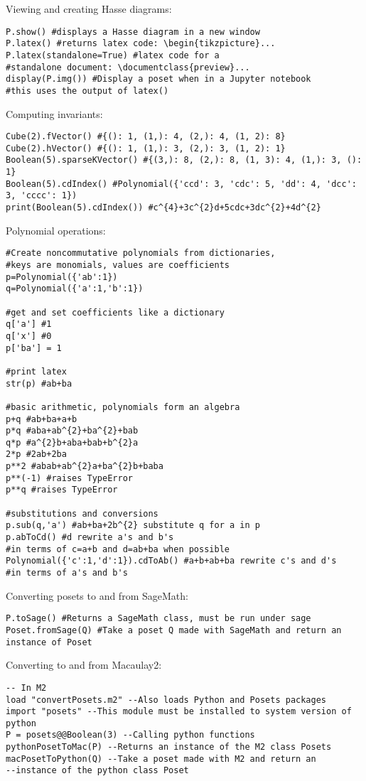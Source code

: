 \documentclass[12pt]{article}
\begin{document}
{{Viewing and creating Hasse diagrams:
\begin{verbatim}
P.show() #displays a Hasse diagram in a new window
P.latex() #returns latex code: \begin{tikzpicture}...
P.latex(standalone=True) #latex code for a
#standalone document: \documentclass{preview}...
display(P.img()) #Display a poset when in a Jupyter notebook
#this uses the output of latex()
\end{verbatim}

Computing invariants:
\begin{verbatim}
Cube(2).fVector() #{(): 1, (1,): 4, (2,): 4, (1, 2): 8}
Cube(2).hVector() #{(): 1, (1,): 3, (2,): 3, (1, 2): 1}
Boolean(5).sparseKVector() #{(3,): 8, (2,): 8, (1, 3): 4, (1,): 3, (): 1}
Boolean(5).cdIndex() #Polynomial({'ccd': 3, 'cdc': 5, 'dd': 4, 'dcc': 3, 'cccc': 1})
print(Boolean(5).cdIndex()) #c^{4}+3c^{2}d+5cdc+3dc^{2}+4d^{2}
\end{verbatim}

Polynomial operations:
\begin{verbatim}
#Create noncommutative polynomials from dictionaries,
#keys are monomials, values are coefficients
p=Polynomial({'ab':1})
q=Polynomial({'a':1,'b':1})

#get and set coefficients like a dictionary
q['a'] #1
q['x'] #0
p['ba'] = 1

#print latex
str(p) #ab+ba

#basic arithmetic, polynomials form an algebra
p+q #ab+ba+a+b
p*q #aba+ab^{2}+ba^{2}+bab
q*p #a^{2}b+aba+bab+b^{2}a
2*p #2ab+2ba
p**2 #abab+ab^{2}a+ba^{2}b+baba
p**(-1) #raises TypeError
p**q #raises TypeError

#substitutions and conversions
p.sub(q,'a') #ab+ba+2b^{2} substitute q for a in p
p.abToCd() #d rewrite a's and b's
#in terms of c=a+b and d=ab+ba when possible
Polynomial({'c':1,'d':1}).cdToAb() #a+b+ab+ba rewrite c's and d's
#in terms of a's and b's
\end{verbatim}

Converting posets to and from SageMath:
\begin{verbatim}
P.toSage() #Returns a SageMath class, must be run under sage
Poset.fromSage(Q) #Take a poset Q made with SageMath and return an instance of Poset
\end{verbatim}

Converting to and from Macaulay2:
\begin{verbatim}
-- In M2
load "convertPosets.m2" --Also loads Python and Posets packages
import "posets" --This module must be installed to system version of python
P = posets@@Boolean(3) --Calling python functions
pythonPosetToMac(P) --Returns an instance of the M2 class Posets
macPosetToPython(Q) --Take a poset made with M2 and return an
--instance of the python class Poset
\end{verbatim}

}}
\end{document}
